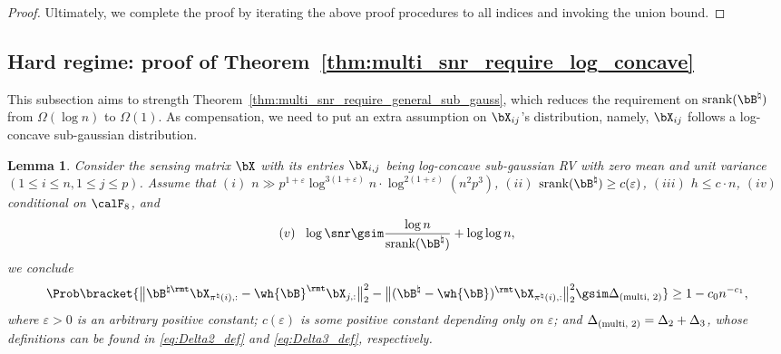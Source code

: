 \documentclass[11pt]{article}
\newtheorem{lemma}{Lemma}
\def \bBtrue {\bB^{\natural}}
\def\srank#1{\textup{srank}(#1)}
\begin{document}
\begin{proof}
Ultimately, we complete the proof by iterating the above proof procedures to all indices and
invoking the union bound.
\end{proof}


\subsection{Hard regime: proof of Theorem~\ref{thm:multi_snr_require_log_concave}}
This subsection aims to strength Theorem~\ref{thm:multi_snr_require_general_sub_gauss}, which reduces the
requirement on $\srank{\bBtrue}$ from $\Omega(\log n)$ to
$\Omega(1)$. As compensation, we need to put an extra assumption on $\bX_{ij}$'s distribution,
namely, $\bX_{ij}$ follows a log-concave sub-gaussian distribution.


\begin{lemma}
\label{lemma:event9_logconcave}
Consider the sensing matrix $\bX$ with its entries
$\bX_{i, j}$ being log-concave sub-gaussian RV with zero mean and unit variance
$(1\leq i \leq n, 1\leq j \leq p)$.
Assume that $(i)$ $n\gg p^{1 + \varepsilon} \log^{3(1 +\varepsilon)} n\cdot \log^{2(1+\varepsilon)}(n^2 p^3)$,
$(ii)$ $\srank{\bBtrue} \geq c(\varepsilon)$,
$(iii)$ $h\leq c\cdot n$, $(iv)$ conditional on $\calF_8$,
and
\begin{align}
\label{eq:event9_logconcave_snr_require}
\textup(v)~~\log \snr \gsim \frac{\log n}{\srank{\bBtrue}} + \log \log n,
\end{align}
we conclude
\[
\Prob\bracket{\big\|\bB^{\natural \rmt}\bX_{\pi^{\natural}(i), :} - \wh{\bB}^{\rmt}\bX_{j, :} \big\|_{2}^2
-  \big\|(\bBtrue - \wh{\bB})^{\rmt} \bX_{\pi^{\natural}(i), : } \big\|_{2}^2
\gsim \Delta_{(\textup{multi, 2})}} \geq 1 - c_0 n^{-c_1},
\]
where $\varepsilon > 0$ is an arbitrary positive constant;
$c(\varepsilon)$ is some positive constant depending only on $\varepsilon$;
and $\Delta_{(\textup{multi, 2})} = \Delta_2 + \Delta_3$, whose definitions can be found in
\eqref{eq:Delta2_def} and \eqref{eq:Delta3_def}, respectively.
\end{lemma}
\end{document}
